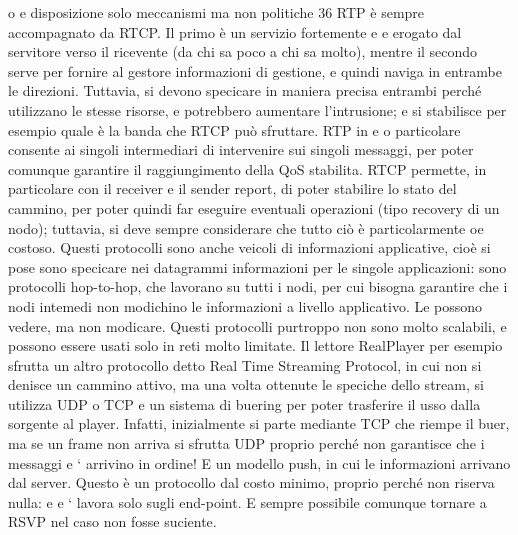 \documentclass[a4paper,12pt]{article}
\begin{document}
o
e
disposizione solo meccanismi ma non politiche
36
RTP è sempre accompagnato da RTCP. Il primo è un servizio fortemente
e
e
erogato dal servitore verso il ricevente (da chi sa poco a chi sa molto), mentre
il secondo serve per fornire al gestore informazioni di gestione, e quindi naviga
in entrambe le direzioni. Tuttavia, si devono specicare in maniera precisa entrambi perché utilizzano le stesse risorse,
e potrebbero aumentare l'intrusione;
e
si stabilisce per esempio quale è la banda che RTCP può sfruttare. RTP in
e
o
particolare consente ai singoli intermediari di intervenire sui singoli messaggi,
per poter comunque garantire il raggiungimento della QoS stabilita. RTCP permette, in particolare con il receiver e il
sender report, di poter stabilire lo stato
del cammino, per poter quindi far eseguire eventuali operazioni (tipo recovery
di un nodo); tuttavia, si deve sempre considerare che tutto ciò è particolarmente
oe
costoso.
Questi protocolli sono anche veicoli di informazioni applicative, cioè si pose
sono specicare nei datagrammi informazioni per le singole applicazioni: sono
protocolli hop-to-hop, che lavorano su tutti i nodi, per cui bisogna garantire che
i nodi intemedi non modichino le informazioni a livello applicativo. Le possono
vedere, ma non modicare.
Questi protocolli purtroppo non sono molto scalabili, e possono essere usati
solo in reti molto limitate. Il lettore RealPlayer per esempio sfrutta un altro
protocollo detto Real Time Streaming Protocol, in cui non si denisce un cammino attivo, ma una volta ottenute le
speciche dello stream, si utilizza UDP
o TCP e un sistema di buering per poter trasferire il usso dalla sorgente al
player. Infatti, inizialmente si parte mediante TCP che riempe il buer, ma se
un frame non arriva si sfrutta UDP proprio perché non garantisce che i messaggi
e
`
arrivino in ordine! E un modello push, in cui le informazioni arrivano dal server. Questo è un protocollo dal costo
minimo, proprio perché non riserva nulla:
e
e
`
lavora solo sugli end-point. E sempre possibile comunque tornare a RSVP nel
caso non fosse suciente.
\end{document}

